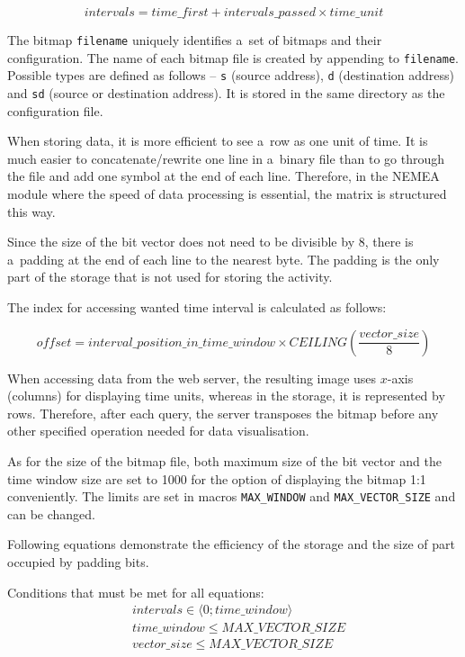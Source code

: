 \begin{equation}\label{equ:range}
   intervals = time\_first + intervals\_passed \times time\_unit
\end{equation}

The bitmap \texttt{filename} uniquely identifies a~set of bitmaps and their configuration.
The name of each bitmap file is created by appending  to \texttt{filename}.
Possible types are defined as follows -- \texttt{s} (source address), \texttt{d} (destination address)
and \texttt{sd} (source or destination address). It is stored in the same directory as the
configuration file.

When storing data, it is more efficient to see a~row as one unit of time. It is much easier to concatenate/rewrite one line in
a~binary file than to go through the file and add one symbol at the end of each line. Therefore, in the NEMEA module where
the speed of data processing is essential, the matrix is structured this way.

Since the size of the bit vector does not need to be divisible by 8, there is a~padding
at the end of each line to the nearest byte. The padding is the only part of the storage
that is not used for storing the activity.

The index for accessing wanted time interval is calculated as follows:

\begin{equation}
offset = interval\_position\_in\_time\_window \times CEILING(\frac{vector\_size}{8})
\end{equation}

When accessing data from the web server, the resulting image uses $x$-axis (columns) for displaying time units,
whereas in the storage, it is represented by rows. Therefore, after each query,
the server transposes the bitmap before any other specified operation needed for data visualisation.

As for the size of the bitmap file, both maximum size of the bit vector and the time window
size are set to 1000 for the option of displaying the bitmap 1:1 conveniently. The limits
are set in macros \texttt{MAX\_WINDOW} and \texttt{MAX\_VECTOR\_SIZE} and can be changed.

Following equations demonstrate the efficiency of the storage and the size of part occupied by padding bits.

Conditions that must be met for all equations:
\begin{align*}
   &intervals \in \langle 0; time\_window \rangle \\
   &time\_window \le MAX\_VECTOR\_SIZE \\
   &vector\_size \le MAX\_VECTOR\_SIZE
\end{align*}

